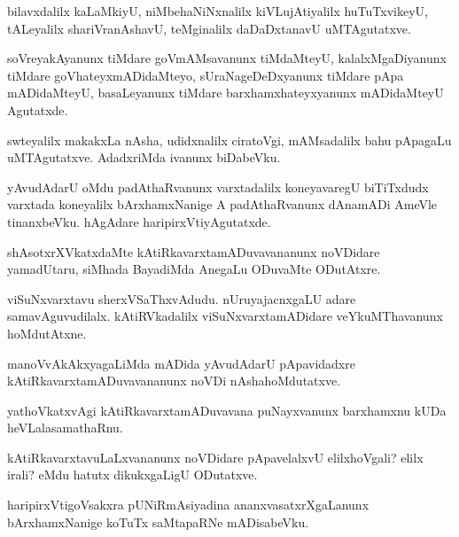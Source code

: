 \begin{mng}
bilavxdalilx kaLaMkiyU, niMbehaNiNxnalilx kiVLujAtiyalilx huTuTxvikeyU, tALeyalilx shariVranAshavU, teMginalilx daDaDxtanavU uMTAgutatxve.
\end{mng}

\begin{mng}
soVreyakAyanunx tiMdare goVmAMsavanunx tiMdaMteyU, kalalxMgaDiyanunx tiMdare goVhateyxmADidaMteyo, sUraNageDeDxyanunx tiMdare pApa mADidaMteyU, basaLeyanunx tiMdare barxhamxhateyxyanunx mADidaMteyU Agutatxde.
\end{mng}

\begin{mng}
swteyalilx makakxLa nAsha, udidxnalilx ciratoVgi, mAMsadalilx bahu pApagaLu uMTAgutatxve. AdadxriMda ivanunx biDabeVku.
\end{mng}

\begin{mng}
yAvudAdarU oMdu padAthaRvanunx varxtadalilx koneyavaregU biTiTxdudx varxtada koneyalilx bArxhamxNanige A padAthaRvanunx dAnamADi AmeVle tinanxbeVku. hAgAdare haripirxVtiyAgutatxde.
\end{mng}

\begin{mng}
shAsotxrXVkatxdaMte kAtiRkavarxtamADuvavananunx noVDidare yamadUtaru, siMhada BayadiMda AnegaLu ODuvaMte ODutAtxre.
\end{mng}

\begin{mng}
viSuNxvarxtavu sherxVSaThxvAdudu. nUruyajacnxgaLU adare samavAguvudilalx. kAtiRVkadalilx viSuNxvarxtamADidare veYkuMThavanunx hoMdutAtxne.
\end{mng}

\begin{mng}
manoVvAkAkxyagaLiMda mADida yAvudAdarU pApavidadxre kAtiRkavarxtamADuvavananunx noVDi nAshahoMdutatxve.
\end{mng}

\begin{mng}
yathoVkatxvAgi kAtiRkavarxtamADuvavana puNayxvanunx barxhamxnu kUDa heVLalasamathaRnu.
\end{mng}

\begin{mng}
kAtiRkavarxtavuLaLxvananunx noVDidare pApavelalxvU elilxhoVgali? elilx irali? eMdu hatutx dikukxgaLigU ODutatxve.
\end{mng}

\begin{mng}
haripirxVtigoVsakxra pUNiRmAsiyadina ananxvasatxrXgaLanunx bArxhamxNanige koTuTx saMtapaRNe mADisabeVku.
\end{mng}

